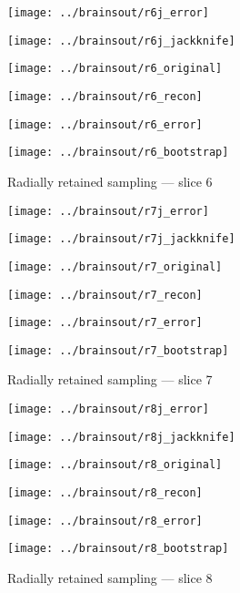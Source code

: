 \documentclass[review,supplement,onefignum,onetabnum,juq]{siamonline181217}
\begin{document}
\begin{figure}
\begin{centering}

\parbox{\imsize}{\texttt{[image: ../brainsout/r6j\_error]}}
\parbox{\imsize}{\texttt{[image: ../brainsout/r6j\_jackknife]}}

\vspace{\vertsep}

\parbox{\imsize}{\texttt{[image: ../brainsout/r6\_original]}}
\parbox{\imsize}{\texttt{[image: ../brainsout/r6\_recon]}}

\vspace{\vertsep}

\parbox{\imsize}{\texttt{[image: ../brainsout/r6\_error]}}
\parbox{\imsize}{\texttt{[image: ../brainsout/r6\_bootstrap]}}

\end{centering}
\caption{Radially retained sampling --- slice 6}
\end{figure}


\begin{figure}
\begin{centering}

\parbox{\imsize}{\texttt{[image: ../brainsout/r7j\_error]}}
\parbox{\imsize}{\texttt{[image: ../brainsout/r7j\_jackknife]}}

\vspace{\vertsep}

\parbox{\imsize}{\texttt{[image: ../brainsout/r7\_original]}}
\parbox{\imsize}{\texttt{[image: ../brainsout/r7\_recon]}}

\vspace{\vertsep}

\parbox{\imsize}{\texttt{[image: ../brainsout/r7\_error]}}
\parbox{\imsize}{\texttt{[image: ../brainsout/r7\_bootstrap]}}

\end{centering}
\caption{Radially retained sampling --- slice 7}
\end{figure}


\begin{figure}
\begin{centering}

\parbox{\imsize}{\texttt{[image: ../brainsout/r8j\_error]}}
\parbox{\imsize}{\texttt{[image: ../brainsout/r8j\_jackknife]}}

\vspace{\vertsep}

\parbox{\imsize}{\texttt{[image: ../brainsout/r8\_original]}}
\parbox{\imsize}{\texttt{[image: ../brainsout/r8\_recon]}}

\vspace{\vertsep}

\parbox{\imsize}{\texttt{[image: ../brainsout/r8\_error]}}
\parbox{\imsize}{\texttt{[image: ../brainsout/r8\_bootstrap]}}

\end{centering}
\caption{Radially retained sampling --- slice 8}
\end{figure}
\end{document}
